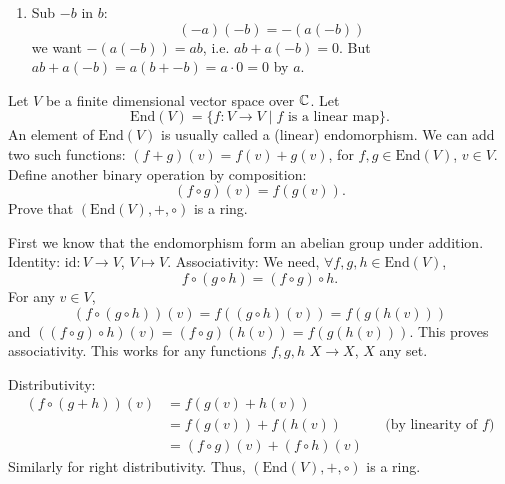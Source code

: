 \documentclass[10pt, a4paper]{article}
\begin{document}
\begin{problem}[Question $2$]
\begin{solution}
\begin{enumerate}[label = (\alph*)]
            \item
            Sub $-b$ in $b$:
            \[
            (-a)(-b) = -(a(-b))
            \]
            we want $-(a(-b)) = ab$,
            i.e.
            $ab + a(-b) = 0$.
            But $ab + a(-b) = a(b + -b) = a \cdot 0 = 0$ by $a$.
        \end{enumerate}
    \end{solution}
\end{problem}

\begin{problem}[Question $3$]
    Let $V$ be a finite dimensional vector space over $\mathbb{C}$.
    Let
    \[
    \mathrm{End}(V) = \{f : V \to V \mid f\text{ is a linear map}\}.
    \]
    An element of $\mathrm{End}(V)$ is usually called a
    (linear)
    endomorphism.
    We can add two such functions:
    $(f + g)(v) = f(v) + g(v)$,
    for $f, g \in \mathrm{End}(V)$,
    $v \in V$.
    Define another binary operation by composition:
    \[
    (f \circ g)(v) = f(g(v)).
    \]
    Prove that $(\mathrm{End}(V), +, \circ)$ is a ring.

    \begin{solution}
        First we know that the endomorphism form an abelian group under addition.
        Identity:
        $\mathrm{id} : V \to V$,
        $V \mapsto V$.
        Associativity:
        We need,
        $\forall f, g, h \in \mathrm{End}(V)$,
        \[
        f \circ (g \circ h) = (f \circ g) \circ h.
        \]
        For any $v \in V$,
        \[
        (f \circ (g \circ h))(v) = f((g \circ h)(v)) = f(g(h(v)))
        \]
        and $((f \circ g) \circ h)(v) = (f \circ g)(h(v)) = f(g(h(v)))$.
        This proves associativity.
        This works for any functions $f, g, h$ $X \to X$,
        $X$ any set.

        Distributivity:
        \begin{align*}
            (f \circ (g + h))(v) &= f(g(v) + h(v)) \\
            &= f(g(v)) + f(h(v)) &&\text{(by linearity of $f$)} \\
            &= (f \circ g)(v) + (f \circ h)(v)
        \end{align*}
        Similarly for right distributivity.
        Thus,
        $(\mathrm{End}(V), +, \circ)$ is a ring.
    \end{solution}
\end{problem}
\end{document}
